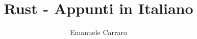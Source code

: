 \author{Emanuele Carraro}

\title{Rust - Appunti in Italiano}
\maketitle

\newpage
\tableofcontents
